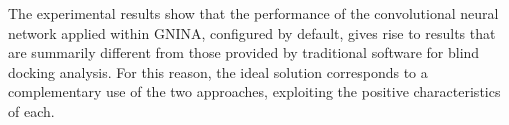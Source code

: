 The experimental results show that the performance of the convolutional neural network applied within GNINA, configured by default, gives rise to results that are summarily different from those provided by traditional software for blind docking analysis. For this reason, the ideal solution corresponds to a complementary use of the two approaches, exploiting the positive characteristics of each.